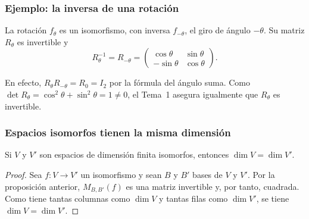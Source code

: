 \begin{frame}
    \frametitle{Ejemplo: la inversa de una rotación}

    \begin{example}
        La rotación $f_\theta$ es un isomorfismo, con inversa $f_{-\theta}$, 
        el giro de ángulo $-\theta$. Su matriz $R_\theta$ es invertible y
        \[
            R_\theta^{-1}=R_{-\theta}=
            \begin{pmatrix}
                \cos\theta&\sin\theta\\-\sin\theta&\cos\theta
            \end{pmatrix}.
        \]
    \end{example}

    \medskip

    En efecto, $R_\theta R_{-\theta}=R_0=I_2$ por la fórmula del ángulo
    suma. Como $\det R_\theta=\cos^2\theta+\sin^2\theta=1\neq0$, el Tema~1
    asegura igualmente que $R_\theta$ es invertible.
\end{frame}


\begin{frame}
    \frametitle{Espacios isomorfos tienen la misma dimensión}

    \begin{corollary}
        Si $V$ y $V'$ son espacios de dimensión finita isomorfos, entonces
        $\dim V=\dim V'$.
    \end{corollary}

    \begin{proof}
        Sea $f\colon V\to V'$ un isomorfismo y sean $B$ y $B'$ bases de $V$
        y $V'$. Por la proposición anterior, $M_{B,B'}(f)$ es una matriz
        invertible y, por tanto, cuadrada. Como tiene tantas columnas como
        $\dim V$ y tantas filas como $\dim V'$, se tiene
        $\dim V=\dim V'$.
    \end{proof}
\end{frame}
